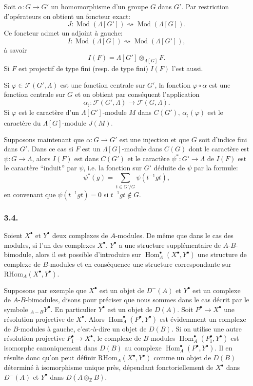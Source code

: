 \documentclass[11pt]{article}
\DeclareMathOperator{\Hom}{Hom}
\newcommand{\R}{\mathrm{R}}\newcommand{\RHomCore}{\mathrm{RHom}}
\providecommand{\RHom}{\RHomCore}
\providecommand{\RHom}{\RHomCore}
\providecommand{\Hom}{\operatorname{Hom}}
\providecommand{\RHom}{\R\mathcal{H}om}
\providecommand{\R}{\mathrm R}
\providecommand{\Mod}{\operatorname{Mod}}
\providecommand{\RHom}{\RHomCore}
\providecommand{\Hom}{\operatorname{Hom}}
\begin{document}
Soit $\alpha:G\to G'$ un homomorphisme d'un groupe $G$ dans $G'$. Par restriction d'opérateurs on obtient un foncteur exact:
\[
J:\Mod(\Lambda[G'])\rightsquigarrow\Mod(\Lambda[G]).
\]
Ce foncteur admet un adjoint à gauche:
\[
I:\Mod(\Lambda[G])\rightsquigarrow\Mod(\Lambda[G']),
\]
à savoir
\[
I(F)=\Lambda[G']\otimes_{\Lambda[G]}F.
\]
Si $F$ est projectif de type fini (resp. de type fini) $I(F)$ l'est aussi.

Si $\varphi\in\mathcal F(G',\Lambda)$ est une fonction centrale sur $G'$, la fonction $\varphi\circ\alpha$ est une fonction centrale sur $G$ et on obtient par conséquent l'application
\[
\alpha_\natural: \mathcal F(G',\Lambda)\longrightarrow\mathcal F(G,\Lambda).
\]
Si $\varphi$ est le caractère d'un $\Lambda[G']$-module $M$ dans $C(G')$, $\alpha_\natural(\varphi)$ est le caractère du $\Lambda[G]$-module $J(M)$.

Supposons maintenant que $\alpha:G\to G'$ est une injection et que $G$ soit d'indice fini dans $G'$. Dans ce cas si $F$ est un $\Lambda[G]$-module dans $C(G)$ dont le caractère est $\psi:G\to\Lambda$, alors $I(F)$ est dans $C(G')$ et le caractère $\psi^*:G'\to\Lambda$ de $I(F)$ est le caractère ``induit'' par $\psi$, i.e. la fonction sur $G'$ déduite de $\psi$ par la formule:
\[
\psi^*(g)=\sum_{t\in G'/G}\psi(t^{-1}gt),
\tag{3.3.1}
\]
en
convenant que $\psi(t^{-1}gt)=0$ si $t^{-1}gt\notin G$.

\subsubsection*{3.4.}

Soient $X^\bullet$ et $Y^\bullet$ deux complexes de $A$-modules. De même que dans le cas des modules, si l'un des complexes $X^\bullet$, $Y^\bullet$ a une structure supplémentaire de $A$-$B$-bimodule, alors il est possible d'introduire sur $\Hom_A^\bullet(X^\bullet,Y^\bullet)$ une structure de complexe de $B$-modules et en conséquence une structure correspondante sur $\RHom_A(X^\bullet,Y^\bullet)$.

Supposons par exemple que $X^\bullet$ est un objet de $D^-(A)$ et $Y^\bullet$ est un complexe de $A$-$B$-bimodules, disons pour préciser que nous sommes dans le cas décrit par le symbole ${}_{A-B}Y^\bullet$. En particulier $Y^\bullet$ est un objet de $D(A)$. Soit $P^\bullet\to X^\bullet$ une résolution projective de $X^\bullet$. Alors $\Hom_A^\bullet(P^\bullet,Y^\bullet)$ est évidemment un complexe de $B$-modules à gauche, c'est-à-dire un objet de $D(B)$. Si on utilise une autre résolution projective $P_1^\bullet\to X^\bullet$, le complexe de $B$-modules $\Hom_A^\bullet(P_1^\bullet,Y^\bullet)$ est isomorphe canoniquement dans $D(B)$ au complexe $\Hom_A^\bullet(P^\bullet,Y^\bullet)$. Il en résulte donc qu'on peut définir $\RHom_A(X^\bullet,Y^\bullet)$ comme un objet de $D(B)$ déterminé à isomorphisme unique près, dépendant fonctoriellement de $X^\bullet$ dans $D^-(A)$ et $Y^\bullet$ dans $D(A\otimes_{\mathbb Z}B)$.
\end{document}
